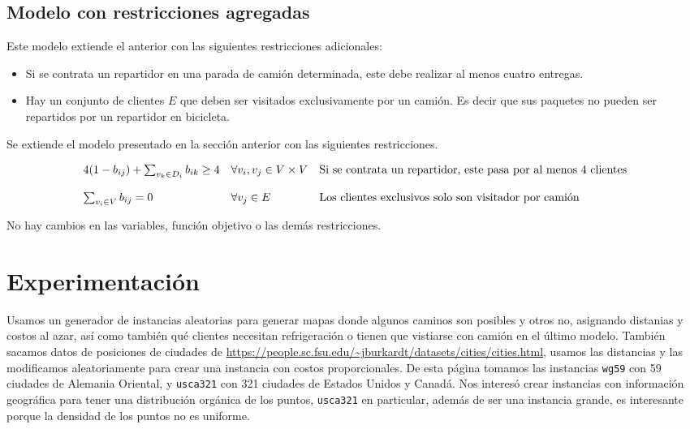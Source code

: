 \documentclass[10pt]{article}
\begin{document}
	\subsection{Modelo con restricciones agregadas}
	Este modelo extiende el anterior con las siguientes restricciones adicionales:
	\begin{itemize}
		\item Si se contrata un repartidor en una parada de camión determinada, este debe realizar al menos cuatro entregas.
		\item Hay un conjunto de clientes $E$ que deben ser visitados exclusivamente por un camión. Es decir que sus paquetes no pueden ser repartidos por un repartidor en bicicleta.
	\end{itemize}
	
	Se extiende el modelo presentado en la sección anterior con las siguientes restricciones.
	
		\[
	\begin{array}{l l l}
		4(1 - b_{ij}) + \sum_{v_k \in D_i} b_{ik} \geq 4 & \forall v_i, v_j \in V \times V & \text{Si se contrata un repartidor, este pasa por al menos 4 clientes} \\
		\\
		\sum_{v_i \in V}  b_{ij} = 0 & \forall v_j \in E  & \text{Los clientes exclusivos solo son visitador por camión} \\
	\end{array}
	\]
	
	No hay cambios en las variables, función objetivo o las demás restricciones.

	\section{Experimentación}

	Usamos un generador de instancias aleatorias para generar mapas donde algunos caminos son posibles y otros no, asignando distanias y costos al azar, así como también qué clientes necesitan refrigeración o tienen que vistiarse con camión en el último modelo. También sacamos datos de posiciones de ciudades de \url{https://people.sc.fsu.edu/~jburkardt/datasets/cities/cities.html}, usamos las distancias y las modificamos aleatoriamente para crear una instancia con costos proporcionales. De esta página tomamos las instancias \texttt{wg59} con 59 ciudades de Alemania Oriental, y \texttt{usca321} con 321 ciudades de Estados Unidos y Canadá. Nos interesó crear instancias con información geográfica para tener una distribución orgánica de los puntos, \texttt{usca321} en particular, además de ser una instancia grande, es interesante porque la densidad de los puntos no es uniforme.
\end{document}
